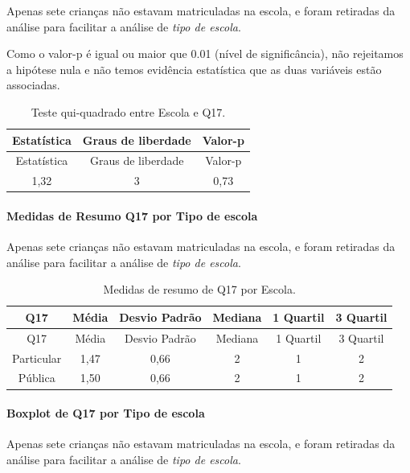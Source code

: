 \documentclass[]{article}
\let\oldparagraph\paragraph
\renewcommand{\paragraph}[1]{\oldparagraph{#1}\mbox{}}
\begin{document}
Apenas sete crianças não estavam matriculadas na escola, e foram retiradas da análise para facilitar a análise de \emph{tipo de escola}.

Como o valor-p é igual ou maior que 0.01 (nível de significância), não rejeitamos a hipótese nula e não temos evidência estatística que as duas variáveis estão associadas.

\begin{longtable}[]{@{}ccc@{}}
\caption{\label{tab:unnamed-chunk-233}Teste qui-quadrado entre Escola e Q17.}\tabularnewline
\toprule
Estatística & Graus de liberdade & Valor-p\tabularnewline
\midrule
\endfirsthead
\toprule
Estatística & Graus de liberdade & Valor-p\tabularnewline
\midrule
\endhead
1,32 & 3 & 0,73\tabularnewline
\bottomrule
\end{longtable}

\cleardoublepage

\hypertarget{medidas-de-resumo-q17-por-tipo-de-escola}{%
\paragraph{Medidas de Resumo Q17 por Tipo de escola}\label{medidas-de-resumo-q17-por-tipo-de-escola}}

Apenas sete crianças não estavam matriculadas na escola, e foram retiradas da análise para facilitar a análise de \emph{tipo de escola}.

\begin{longtable}[]{@{}cccccc@{}}
\caption{\label{tab:unnamed-chunk-234}Medidas de resumo de Q17 por Escola.}\tabularnewline
\toprule
Q17 & Média & Desvio Padrão & Mediana & 1 Quartil & 3 Quartil\tabularnewline
\midrule
\endfirsthead
\toprule
Q17 & Média & Desvio Padrão & Mediana & 1 Quartil & 3 Quartil\tabularnewline
\midrule
\endhead
Particular & 1,47 & 0,66 & 2 & 1 & 2\tabularnewline
Pública & 1,50 & 0,66 & 2 & 1 & 2\tabularnewline
\bottomrule
\end{longtable}

\hypertarget{boxplot-de-q17-por-tipo-de-escola}{%
\paragraph{Boxplot de Q17 por Tipo de escola}\label{boxplot-de-q17-por-tipo-de-escola}}

Apenas sete crianças não estavam matriculadas na escola, e foram retiradas da análise para facilitar a análise de \emph{tipo de escola}.
\end{document}

